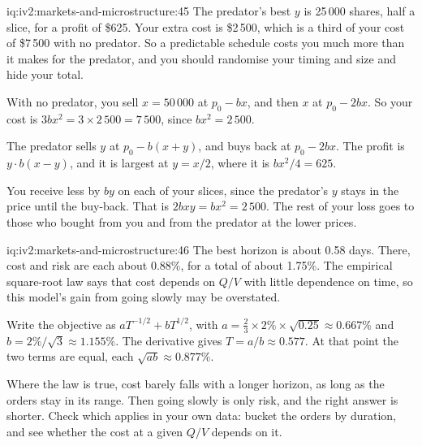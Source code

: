 \begin{solution}{iq:iv2:markets-and-microstructure:45}
The predator's best $y$ is 25\,000 shares, half a slice, for a profit of \$625. Your extra cost is \$2\,500, which is a third of your cost of \$7\,500 with no predator. So a predictable schedule costs you much more than it makes for the predator, and you should randomise your timing and size and hide your total.

With no predator, you sell $x = 50\,000$ at $p_0 - bx$, and then $x$ at $p_0 - 2bx$. So your cost is $3bx^2 = 3 \times 2\,500 = 7\,500$, since $bx^2 = 2\,500$.

The predator sells $y$ at $p_0 - b(x + y)$, and buys back at $p_0 - 2bx$. The profit is $y \cdot b(x - y)$, and it is largest at $y = x/2$, where it is $bx^2/4 = 625$.

You receive less by $by$ on each of your slices, since the predator's $y$ stays in the price until the buy-back. That is $2bxy = bx^2 = 2\,500$. The rest of your loss goes to those who bought from you and from the predator at the lower prices.

\end{solution}

\begin{solution}{iq:iv2:markets-and-microstructure:46}
The best horizon is about 0.58 days. There, cost and risk are each about 0.88\%, for a total of about 1.75\%. The empirical square-root law says that cost depends on $Q/V$ with little dependence on time, so this model's gain from going slowly may be overstated.

Write the objective as $aT^{-1/2} + bT^{1/2}$, with $a = \tfrac23 \times 2\% \times \sqrt{0.25} \approx 0.667\%$ and $b = 2\%/\sqrt 3 \approx 1.155\%$. The derivative gives $T = a/b \approx 0.577$. At that point the two terms are equal, each $\sqrt{ab} \approx 0.877\%$.

Where the law is true, cost barely falls with a longer horizon, as long as the orders stay in its range. Then going slowly is only risk, and the right answer is shorter. Check which applies in your own data: bucket the orders by duration, and see whether the cost at a given $Q/V$ depends on it.

\end{solution}

